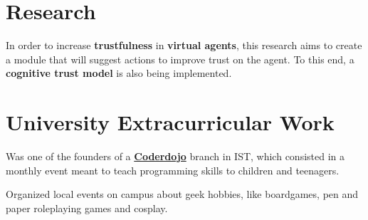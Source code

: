 \documentclass[letterpaper]{deedy-resume} %
\begin{document}
\begin{minipage}[t]{0.64\textwidth}
\sectionspace %



\section{Research}


In order to increase \textbf{trustfulness} in \textbf{virtual agents}, this research aims to create a module that will suggest actions to improve trust on the agent. To this end, a \textbf{cognitive trust model} is also being implemented.


\sectionspace %


\section{University Extracurricular Work}


Was one of the founders of a \textbf{\href{https://coderdojo.com/}{Coderdojo}} branch in IST, which consisted in a monthly event meant to teach programming skills to children and teenagers.

\sectionspace %



Organized local events on campus about geek hobbies, like boardgames, pen and paper roleplaying games and cosplay.

\sectionspace %



\end{minipage}
\end{document}
